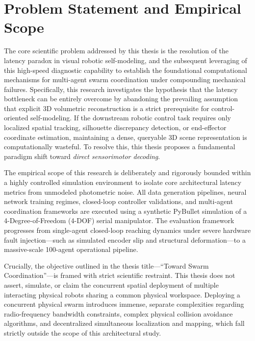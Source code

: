 \documentclass[12pt,a4paper,oneside]{report}
\begin{document}
\section{Problem Statement and Empirical Scope}

The core scientific problem addressed by this thesis is the resolution of the latency paradox in visual robotic self-modeling, and the subsequent leveraging of this high-speed diagnostic capability to establish the foundational computational mechanisms for multi-agent swarm coordination under compounding mechanical failures. Specifically, this research investigates the hypothesis that the latency bottleneck can be entirely overcome by abandoning the prevailing assumption that explicit 3D volumetric reconstruction is a strict prerequisite for control-oriented self-modeling. If the downstream robotic control task requires only localized spatial tracking, silhouette discrepancy detection, or end-effector coordinate estimation, maintaining a dense, queryable 3D scene representation is computationally wasteful. To resolve this, this thesis proposes a fundamental paradigm shift toward \textit{direct sensorimotor decoding}. 

The empirical scope of this research is deliberately and rigorously bounded within a highly controlled simulation environment to isolate core architectural latency metrics from unmodeled photometric noise. All data generation pipelines, neural network training regimes, closed-loop controller validations, and multi-agent coordination frameworks are executed using a synthetic PyBullet simulation of a 4-Degree-of-Freedom (4-DOF) serial manipulator. The evaluation framework progresses from single-agent closed-loop reaching dynamics under severe hardware fault injection—such as simulated encoder slip and structural deformation—to a massive-scale 100-agent operational pipeline.

Crucially, the objective outlined in the thesis title—``Toward Swarm Coordination''—is framed with strict scientific restraint. This thesis does not assert, simulate, or claim the concurrent spatial deployment of multiple interacting physical robots sharing a common physical workspace. Deploying a concurrent physical swarm introduces immense, separate complexities regarding radio-frequency bandwidth constraints, complex physical collision avoidance algorithms, and decentralized simultaneous localization and mapping, which fall strictly outside the scope of this architectural study.
\end{document}
